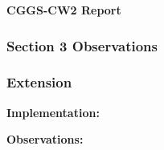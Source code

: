 \documentclass[11pt,a4paper]{article}
\begin{document}
 

{\Large \textbf{CGGS-CW2 Report}}\\
\indent {}

\subsubsection*{Section 3 Observations}

\subsubsection*{Extension}

\noindent \hspace{20pt} \textbf{Implementation:}

\noindent \hspace{20pt} \noindent \textbf{Observations:}
\end{document}

